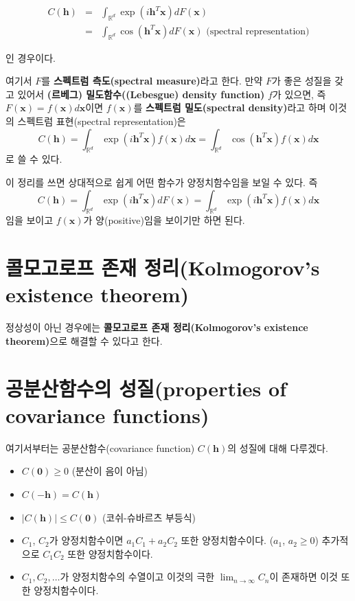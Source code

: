 \documentclass[b5paper,]{scrbook}
\theoremstyle{plain}
\theoremstyle{definition}
\numberwithin{equation}{section}
\begin{document}
\begin{eqnarray}
C(\mathbf{h})&=&\int_{\mathbb{R}^{d}}\exp(i\mathbf{h}^{T}\mathbf{x})dF(\mathbf{x})\nonumber\\
&=&\int_{\mathbb{R}^{d}}\cos(\mathbf{h}^{T}\mathbf{x})dF(\mathbf{x}) \text{ (spectral representation)}
\end{eqnarray}

인 경우이다.

여기서 \(F\)를 \textbf{스펙트럼 측도(spectral measure)}라고 한다. 만약
\(F\)가 좋은 성질을 갖고 있어서 \textbf{(르베그) 밀도함수((Lebesgue)
density function)} \(f\)가 있으면, 즉
\(F(\mathbf{x})=f(\mathbf{x})d\mathbf{x}\)이면 \(f(\mathbf{x})\)를
\textbf{스펙트럼 밀도(spectral density)}라고 하며 이것의 스펙트럼
표현(spectral representation)은 \[
C(\mathbf{h})=\int_{\mathbb{R}^{d}}\exp(i\mathbf{h}^{T}\mathbf{x})f(\mathbf{x})d\mathbf{x}=\int_{\mathbb{R}^{d}}\cos(\mathbf{h}^{T}\mathbf{x})f(\mathbf{x})d\mathbf{x}
\] 로 쓸 수 있다.

이 정리를 쓰면 상대적으로 쉽게 어떤 함수가 양정치함수임을 보일 수 있다.
즉 \[
C(\mathbf{h}) =\int_{\mathbb{R}^{d}}\exp(i\mathbf{h}^{T}\mathbf{x})dF(\mathbf{x})
=\int_{\mathbb{R}^{d}}\exp(i\mathbf{h}^{T}\mathbf{x})f(\mathbf{x})d\mathbf{x}
\] 임을 보이고 \(f(\mathbf{x})\)가 양(positive)임을 보이기만 하면 된다.

\section{콜모고로프 존재 정리(Kolmogorov's existence
theorem)}\label{--kolmogorovs-existence-theorem}

정상성이 아닌 경우에는 \textbf{콜모고로프 존재 정리(Kolmogorov's
existence theorem)}으로 해결할 수 있다고 한다.

\section{공분산함수의 성질(properties of covariance
functions)}\label{-properties-of-covariance-functions}

여기서부터는 공분산함수(covariance function) \(C(\mathbf{h})\)의 성질에
대해 다루겠다.

\begin{itemize}
\item
  \(C(\mathbf{0}) \geq 0\) (분산이 음이 아님)
\item
  \(C(\mathbf{-h})=C(\mathbf{h})\)
\item
  \(|C(\mathbf{h})| \leq C(\mathbf{0})\) (코쉬-슈바르츠 부등식)
\item
  \(C_{1}\), \(C_{2}\)가 양정치함수이면 \(a_{1}C_{1}+a_{2}C_{2}\) 또한
  양정치함수이다. (\(a_{1}\), \(a_{2} \geq 0\)) 추가적으로
  \(C_{1}C_{2}\) 또한 양정치함수이다.
\item
  \(C_{1}, C_{2}, \ldots\)가 양정치함수의 수열이고 이것의 극한
  \(\lim_{n \rightarrow \infty}C_{n}\)이 존재하면 이것 또한
  양정치함수이다.
\end{itemize}
\end{document}
